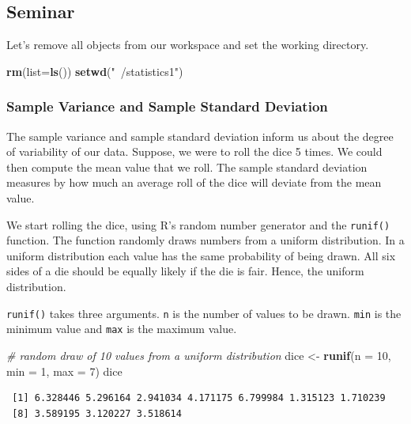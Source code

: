 \documentclass[]{article}
\newenvironment{Shaded}{\begin{snugshade}}{\end{snugshade}}
\newcommand{\KeywordTok}[1]{\textcolor[rgb]{0.13,0.29,0.53}{\textbf{#1}}}
\newcommand{\DataTypeTok}[1]{\textcolor[rgb]{0.13,0.29,0.53}{#1}}
\newcommand{\DecValTok}[1]{\textcolor[rgb]{0.00,0.00,0.81}{#1}}
\newcommand{\StringTok}[1]{\textcolor[rgb]{0.31,0.60,0.02}{#1}}
\newcommand{\CommentTok}[1]{\textcolor[rgb]{0.56,0.35,0.01}{\textit{#1}}}
\newcommand{\NormalTok}[1]{#1}
\theoremstyle{definition}
\theoremstyle{definition}
\theoremstyle{definition}
\theoremstyle{remark}
\begin{document}
\subsection{Seminar}\label{seminar-4}

Let's remove all objects from our workspace and set the working
directory.

\begin{Shaded}
\begin{Highlighting}[]
\KeywordTok{rm}\NormalTok{(}\DataTypeTok{list=}\KeywordTok{ls}\NormalTok{())}
\KeywordTok{setwd}\NormalTok{(}\StringTok{"~/statistics1"}\NormalTok{)}
\end{Highlighting}
\end{Shaded}

\subsubsection{Sample Variance and Sample Standard
Deviation}\label{sample-variance-and-sample-standard-deviation}

The sample variance and sample standard deviation inform us about the
degree of variability of our data. Suppose, we were to roll the dice 5
times. We could then compute the mean value that we roll. The sample
standard deviation measures by how much an average roll of the dice will
deviate from the mean value.

We start rolling the dice, using R's random number generator and the
\texttt{runif()} function. The function randomly draws numbers from a
uniform distribution. In a uniform distribution each value has the same
probability of being drawn. All six sides of a die should be equally
likely if the die is fair. Hence, the uniform distribution.

\texttt{runif()} takes three arguments. \texttt{n} is the number of
values to be drawn. \texttt{min} is the minimum value and \texttt{max}
is the maximum value.

\begin{Shaded}
\begin{Highlighting}[]
\CommentTok{# random draw of 10 values from a uniform distribution}
\NormalTok{dice <-}\StringTok{ }\KeywordTok{runif}\NormalTok{(}\DataTypeTok{n =} \DecValTok{10}\NormalTok{, }\DataTypeTok{min =} \DecValTok{1}\NormalTok{, }\DataTypeTok{max =} \DecValTok{7}\NormalTok{)}
\NormalTok{dice}
\end{Highlighting}
\end{Shaded}

\begin{verbatim}
 [1] 6.328446 5.296164 2.941034 4.171175 6.799984 1.315123 1.710239
 [8] 3.589195 3.120227 3.518614
\end{verbatim}
\end{document}
